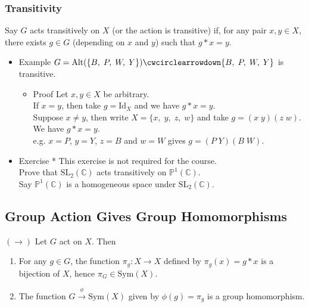 \documentclass[11pt]{article}
\newcommand{\0}{\emptyset}
\newcommand{\C}{\mathbb{C}}
\begin{document}
\subsubsection*{Transitivity}
\label{sec:org84a61d5}
Say \(G\) acts transitively on \(X\) (or the action is transitive) if, for any pair \(x,y\in X\), there exists \(g\in G\) (depending on \(x\) and \(y\)) such that \(g*x=y\).\\[0pt]
\begin{itemize}
\item Example
\label{sec:orgb604bcb}
\(G=\text{Alt}(\{B,\;P,\;W,\;Y\}) \cwcirclearrowdown \{B,\;P,\;W,\;Y\}\) is transitive.\\[0pt]
\begin{itemize}
\item Proof
\label{sec:org62fcbf8}
Let \(x,y\in X\) be arbitrary.\\[0pt]
If \(x=y\), then take \(g=\text{Id}_{X}\) and we have \(g*x=y\).\\[0pt]
Suppose \(x\neq y\), then write \(X=\{x,\;y,\;z,\;w\}\) and take \(g=(x\;y)(z\;w)\). We have \(g*x=y\).\\[0pt]
e.g. \(x=P\), \(y=Y\), \(z=B\) and \(w=W\) gives \(g=(P\;Y)(B\;W)\).\\[0pt]
\end{itemize}
\item Exercise *
\label{sec:org1e2b694}
This exercise is not required for the course.\\[0pt]
Prove that \(\text{SL}_{2}(\C)\) acts transitively on \(\mathbb{P}^{1}(\C)\).\\[0pt]
Say \(\mathbb{P}^{1}(\C)\) is a homogeneous space under \(\text{SL}_{2}(\C)\).\\[0pt]
\end{itemize}
\subsection*{Group Action Gives Group Homomorphisms}
\label{sec:org22c1e4a}
\((\longrightarrow)\) Let \(G\) act on \(X\). Then\\[0pt]
\begin{enumerate}
\item For any \(g\in G\), the function \(\pi_{g}:X\to X\) defined by \(\pi_{g}(x)=g*x\) is a bijection of \(X\), hence \(\pi_{G}\in\text{Sym}(X)\).\\[0pt]
\item The function \(G\overset{\phi}{\to}\text{Sym}(X)\) given by \(\phi(g)=\pi_{g}\) is a group homomorphism.\\[0pt]
\end{enumerate}
\end{document}
